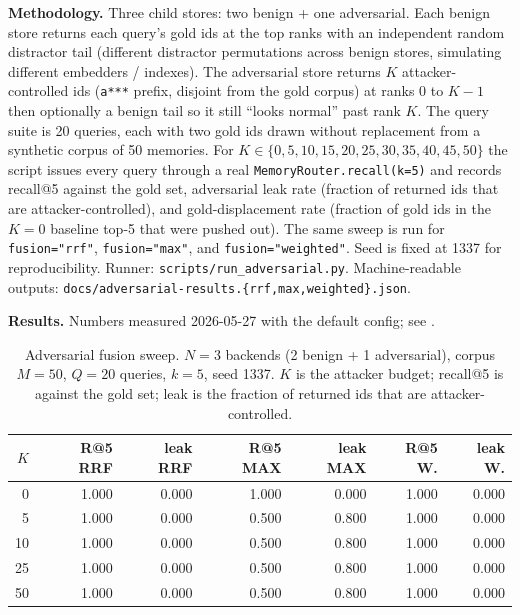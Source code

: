 \documentclass[11pt,letterpaper,twocolumn]{article}
\begin{document}
\textbf{Methodology.} Three child stores: two benign + one adversarial. Each benign store returns each query's gold ids at the top ranks with an independent random distractor tail (different distractor permutations across benign stores, simulating different embedders / indexes). The adversarial store returns $K$ attacker-controlled ids (\texttt{a***} prefix, disjoint from the gold corpus) at ranks $0$ to $K-1$ then optionally a benign tail so it still ``looks normal'' past rank $K$. The query suite is 20 queries, each with two gold ids drawn without replacement from a synthetic corpus of 50 memories. For $K \in \{0, 5, 10, 15, 20, 25, 30, 35, 40, 45, 50\}$ the script issues every query through a real \texttt{MemoryRouter.recall(k=5)} and records recall@5 against the gold set, adversarial leak rate (fraction of returned ids that are attacker-controlled), and gold-displacement rate (fraction of gold ids in the $K=0$ baseline top-5 that were pushed out). The same sweep is run for \texttt{fusion="rrf"}, \texttt{fusion="max"}, and \texttt{fusion="weighted"}. Seed is fixed at 1337 for reproducibility. Runner: \texttt{scripts/run\_adversarial.py}. Machine-readable outputs: \texttt{docs/adversarial-results.\{rrf,max,weighted\}.json}.

\textbf{Results.} Numbers measured 2026-05-27 with the default config; see .

\begin{table}[t]
\centering
\caption{Adversarial fusion sweep. $N=3$ backends (2 benign + 1 adversarial), corpus $M=50$, $Q=20$ queries, $k=5$, seed 1337. $K$ is the attacker budget; recall@5 is against the gold set; leak is the fraction of returned ids that are attacker-controlled.}
\label{tab:adversarial}
\small
\begin{tabular}{rrrrrrr}
\toprule
$K$ & R@5 RRF & leak RRF & R@5 MAX & leak MAX & R@5 W. & leak W. \\
\midrule
0  & 1.000 & 0.000 & 1.000 & 0.000 & 1.000 & 0.000 \\
5  & 1.000 & 0.000 & 0.500 & 0.800 & 1.000 & 0.000 \\
10 & 1.000 & 0.000 & 0.500 & 0.800 & 1.000 & 0.000 \\
25 & 1.000 & 0.000 & 0.500 & 0.800 & 1.000 & 0.000 \\
50 & 1.000 & 0.000 & 0.500 & 0.800 & 1.000 & 0.000 \\
\bottomrule
\end{tabular}
\end{table}
\end{document}
